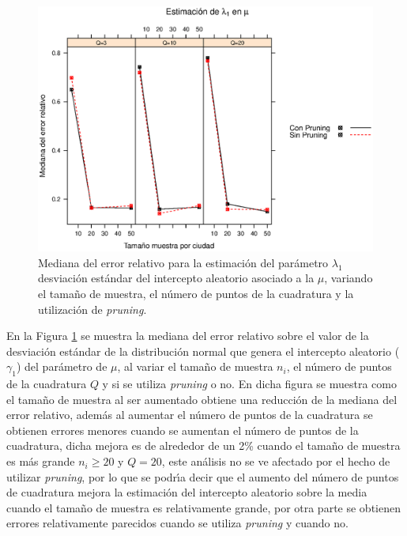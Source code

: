 \begin{figure}
	\begin{center}
		\includegraphics[scale=0.6]{MAPE_lambda1_mu.eps}	
		\caption{Mediana del error relativo para la estimaci\'{o}n del par\'{a}metro $\lambda_1$ desviaci\'{o}n est\'{a}ndar del intercepto aleatorio asociado a la $\mu$, variando el tama\~{n}o de muestra, el n\'{u}mero de puntos de la cuadratura y la utilizaci\'{o}n de \textit{pruning}.}
		\label{MAPE_lambda1_mu}
	\end{center}
\end{figure}

En la Figura \ref{MAPE_lambda1_mu} se muestra la mediana del error relativo sobre el valor de la desviaci\'{o}n est\'{a}ndar de la distribuci\'{o}n normal que genera el intercepto aleatorio ($\gamma_1$) del par\'{a}metro de $\mu$, al variar el tama\~{n}o de muestra $n_i$, el n\'{u}mero de puntos de la cuadratura $Q$ y si se utiliza \textit{pruning} o no. En dicha figura se muestra como el tama\~{n}o de muestra al ser aumentado obtiene una reducci\'{o}n de la mediana del error relativo, adem\'{a}s al aumentar el n\'{u}mero de puntos de la cuadratura se obtienen errores menores cuando se aumentan el n\'{u}mero de puntos de la cuadratura, dicha mejora es de alrededor de un 2\% cuando el tama\~{n}o de muestra es m\'{a}s grande $n_i\geq20$ y $Q=20$, este an\'{a}lisis no se ve afectado por el hecho de utilizar \textit{pruning}, por lo que se podr\'{\i}a decir que el aumento del n\'{u}mero de puntos de cuadratura mejora la estimaci\'{o}n del intercepto aleatorio sobre la media cuando el tama\~{n}o de muestra es relativamente grande, por otra parte se obtienen errores relativamente parecidos cuando se utiliza \textit{pruning} y cuando no.\\


